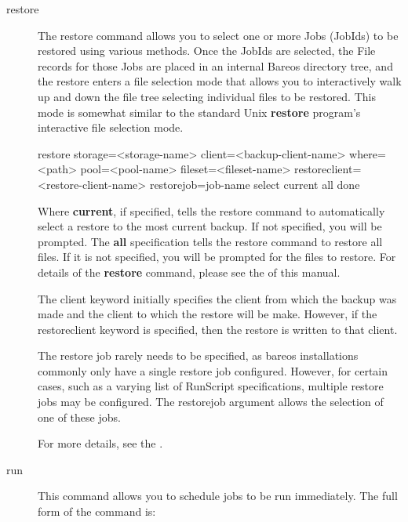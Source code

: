 \begin{description}
\item [restore]
   \label{restore_command}
   The restore command allows you to select one or more Jobs (JobIds) to be
   restored using various methods.  Once the JobIds are selected, the File
   records for those Jobs are placed in an internal Bareos directory tree,
   and the restore enters a file selection mode that allows you to
   interactively walk up and down the file tree selecting individual files
   to be restored.  This mode is somewhat similar to the standard Unix {\bf
   restore} program's interactive file selection mode.

restore storage={\textless}storage-name{\textgreater} client={\textless}backup-client-name{\textgreater}
  where={\textless}path{\textgreater} pool={\textless}pool-name{\textgreater} fileset={\textless}fileset-name{\textgreater}
  restoreclient={\textless}restore-client-name{\textgreater}
  restorejob=\lt{}job-name\gt{}
  select current all done

   Where {\bf current}, if specified, tells the restore command to
   automatically select a restore to the most current backup.  If not
   specified, you will be prompted.  The {\bf all} specification tells the
   restore command to restore all files.  If it is not specified, you will
   be prompted for the files to restore.  For details of the {\bf restore}
   command, please see the  of this
   manual.

   The client keyword initially specifies the client from which the backup
   was made and the client to which the restore will be make.  However,
   if the restoreclient keyword is specified, then the restore is written
   to that client.

   The restore job rarely needs to be specified, as bareos installations
   commonly only have a single restore job configured. However, for certain
   cases, such as a varying list of RunScript specifications, multiple
   restore jobs may be configured. The restorejob argument allows the
   selection of one of these jobs.

    For more details, see the .

\item [run]
   This command allows you to schedule jobs  to be run immediately. The full form
   of the command is:


\end{description}
